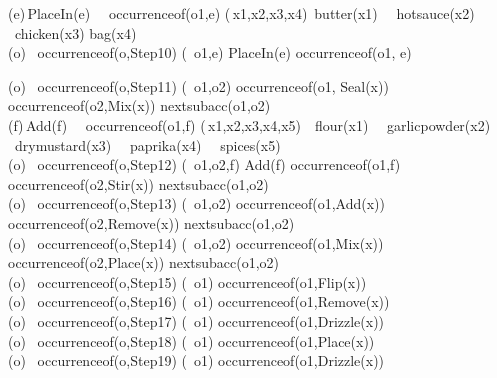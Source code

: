 \begin{center}
(\forall e)\,PlaceIn(e) \  \land \  occurrence\textunderscore of(o1,e) \supset (\exists\,x1,x2,x3,x4)\  \land butter(x1) \ \land \  hotsauce(x2) \land \ chicken(x3) \land bag(x4) \\

(\forall o) \ occurrence\textunderscore of(o,Step10) \supset (\exists\, o1,e)  \land PlaceIn(e) \land occurrence\textunderscore of(o1, e)

(\forall o) \ occurrence\textunderscore of(o,Step11) \supset (\exists\, o1,o2) \land occurrence\textunderscore of(o1, Seal(x)) \land occurrence\textunderscore of(o2,Mix(x)) \land  next\textunderscore subacc(o1,o2) \\

(\forall f)\,Add(f) \  \land \  occurrence\textunderscore of(o1,f) \supset (\exists\,x1,x2,x3,x4,x5)\  \ flour(x1) \ \land \  garlicpowder(x2) \land \ drymustard(x3) \   \land \ paprika(x4)  \  \land \  spices(x5) \\

(\forall o) \ occurrence\textunderscore of(o,Step12) \supset (\exists\, o1,o2,f) \land Add(f) \land occurrence\textunderscore of(o1,f) \land occurrence\textunderscore of(o2,Stir(x)) \land  next\textunderscore subacc(o1,o2) \\

(\forall o) \ occurrence\textunderscore of(o,Step13) \supset (\exists\, o1,o2) \land occurrence\textunderscore of(o1,Add(x)) \land occurrence\textunderscore of(o2,Remove(x)) \land  next\textunderscore subacc(o1,o2) \\

(\forall o) \ occurrence\textunderscore of(o,Step14) \supset (\exists\, o1,o2) \land occurrence\textunderscore of(o1,Mix(x)) \land occurrence\textunderscore of(o2,Place(x)) \land  next\textunderscore subacc(o1,o2) \\

(\forall o) \ occurrence\textunderscore of(o,Step15) \supset (\exists\, o1) \land occurrence\textunderscore of(o1,Flip(x)) \\

(\forall o) \ occurrence\textunderscore of(o,Step16) \supset (\exists\, o1) \land occurrence\textunderscore of(o1,Remove(x)) \\

(\forall o) \ occurrence\textunderscore of(o,Step17) \supset (\exists\, o1) \land occurrence\textunderscore of(o1,Drizzle(x)) \\

(\forall o) \ occurrence\textunderscore of(o,Step18) \supset (\exists\, o1) \land occurrence\textunderscore of(o1,Place(x)) \\

(\forall o) \ occurrence\textunderscore of(o,Step19) \supset (\exists\, o1) \land occurrence\textunderscore of(o1,Drizzle(x)) \\
\end{center}
